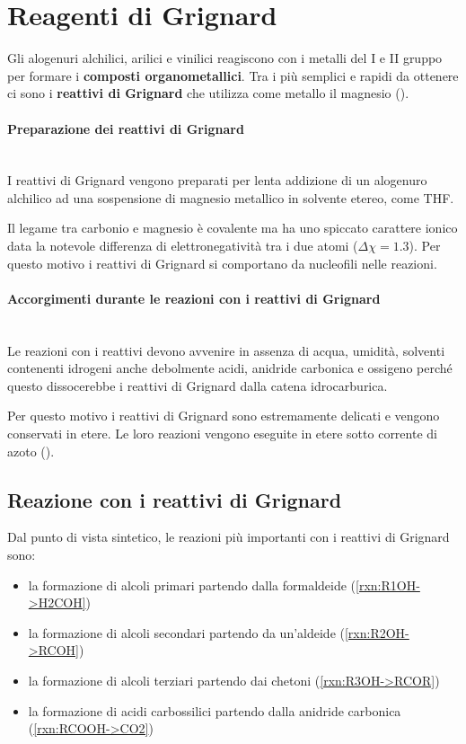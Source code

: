 \section{Reagenti di Grignard}
Gli alogenuri alchilici, arilici e vinilici reagiscono con i metalli del I e II gruppo per formare i \textbf{composti organometallici}. Tra i più semplici e rapidi da ottenere ci sono i \textbf{reattivi di Grignard} che utilizza come metallo il magnesio ().

\paragraph{Preparazione dei reattivi di Grignard}\mbox{}\\
I reattivi di Grignard vengono preparati per lenta addizione di un alogenuro alchilico ad una sospensione di magnesio metallico in solvente etereo, come \ac{THF}.

Il legame tra carbonio e magnesio è covalente ma ha uno spiccato carattere ionico data la notevole differenza di elettronegatività tra i due atomi (\(\Delta \chi = 1.3\)). Per questo motivo i reattivi di Grignard si comportano da nucleofili nelle reazioni.

\paragraph{Accorgimenti durante le reazioni con i reattivi di Grignard}\mbox{}\\
Le reazioni con i reattivi devono avvenire in assenza di acqua, umidità, solventi contenenti idrogeni anche debolmente acidi, anidride carbonica e ossigeno perché questo dissocerebbe i reattivi di Grignard dalla catena idrocarburica.
\begingroup
\begin{reaction}
	 \+  \arrow {} \+  \+  \+ 
\end{reaction}
\endgroup
Per questo motivo i reattivi di Grignard sono estremamente delicati e vengono conservati in etere. Le loro reazioni vengono eseguite in etere sotto corrente di azoto ().

\subsection{Reazione con i reattivi di Grignard}
\noindent Dal punto di vista sintetico, le reazioni più importanti con i reattivi di Grignard sono:
\begin{itemize}
	\item la formazione di alcoli primari partendo dalla formaldeide (\autoref{rxn:R1OH->H2COH})
	\item la formazione di alcoli secondari partendo da un'aldeide (\autoref{rxn:R2OH->RCOH})
	\item la formazione di alcoli terziari partendo dai chetoni (\autoref{rxn:R3OH->RCOR})
	\item la formazione di acidi carbossilici partendo dalla anidride carbonica (\autoref{rxn:RCOOH->CO2})
\end{itemize}

